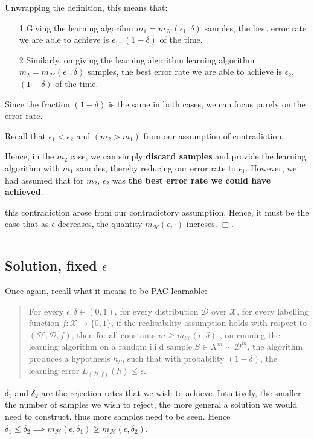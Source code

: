 \documentclass[11pt]{article}
\newcommand{\D}{\ensuremath{\mathcal{D}}}
\renewcommand{\H}{\ensuremath{\mathcal{H}}}
\newcommand{\X}{\ensuremath{\mathcal{X}}}
\def\qed{$\Box$}
\begin{document}
Unwrapping the definition, this means that:

\begin{itemize}
    \item[1] Giving the learning algorihm $m_1 = m_\H(\epsilon_1, \delta)$
        samples, the best error rate we are able to achieve is $\epsilon_1$,
        $(1- \delta)$ of the time.
    \item[2] Similarly, on giving the learning algorithm learning algorithm
        $m_2 = m_\H(\epsilon_1, \delta)$ samples, the best error rate we are able to
        achieve is $\epsilon_2$, $(1- \delta)$ of the time.
\end{itemize}

Since the fraction $(1 - \delta)$ is the same in both cases, we can focus
purely on the error rate.

Recall that $\epsilon_1 < \epsilon_2$ and $(m_2 > m_1)$ from our assumption
of contradiction.

Hence, in the $m_2$ case, we can simply \textbf{discard samples} and provide
the learning algorithm with $m_1$ samples, thereby reducing our error
rate to $\epsilon_1$. However, we had assumed that for $m_2$, $\epsilon_2$
was \textbf{the best error rate we could have achieved}.

this contradiction arose from our contradictory assumption. Hence, it
must be the case that as $\epsilon$ decreases, the quantity $m_\H(\epsilon, \cdot)$
increses. \qed.

\rule{\textwidth}{0.1pt}

\subsection*{Solution, fixed $\epsilon$}

Once again, recall what it means to be PAC-learnable:

\begin{quote}
For every $\epsilon, \delta \in (0, 1)$, for every distribution $\D$ over $\X$,
for every labelling function $f: \X \rightarrow \{0, 1\}$, if the realisability
assumption holds with respect to $(\H, \D, f)$, then for all constants
$m \geq m_\H(\epsilon, \delta)$ , on running the learning algorithm on
a random i.i.d sample $S \in X^m \sim \D^m$, the algorithm produces a hypothesis
$h_S$, such that with probability $(1 - \delta)$, the learning error 
$L_{(\D, f)}(h) \leq \epsilon$.
\end{quote}

$\delta_1$ and $\delta_2$ are the rejection rates that we wish to achieve.
Intuitively, the smaller the number of samples we wish to reject, the more
general a solution we would need to construct, thus more samples need to
be seen.
Hence $\delta_1 \leq \delta_2 \implies m_\H(\epsilon, \delta_1) \geq m_\H(\epsilon, \delta_2)$.
\end{document}
